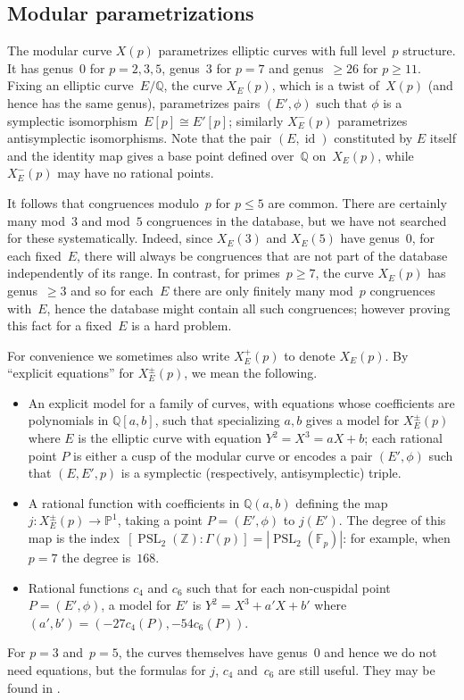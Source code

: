 \documentclass[12pt, reqno]{amsart}
\newcommand{\F}{\mathbb{F}}
\newcommand{\PP}{\mathbb{P}}
\newcommand{\Q}{\mathbb{Q}}
\newcommand{\Z}{\mathbb{Z}}
\newcommand{\PSL}{\operatorname{PSL}}
\DeclareMathOperator{\id}{id}
\numberwithin{equation}{section}
\theoremstyle{definition}
\theoremstyle{remark}
\begin{document}
\subsection{Modular parametrizations}
The modular curve $X(p)$ parametrizes elliptic curves with full
level~$p$ structure. It has genus~$0$ for $p=2,3,5$, genus~$3$ for
$p=7$ and genus~$\ge26$ for $p\ge11$.  Fixing an elliptic
curve~$E/\Q$, the curve $X_E(p)$, which is a twist of~$X(p)$ (and
hence has the same genus), parametrizes pairs $(E',\phi)$ such that
$\phi$ is a symplectic isomorphism~$E[p]\cong E'[p]$; similarly
$X_E^-(p)$ parametrizes antisymplectic isomorphisms. Note that the pair $(E,\id)$ constituted by $E$ itself and the identity map
gives a base point defined over~$\Q$ on~$X_E(p)$, while $X_E^-(p)$ may have no rational points.

It follows that congruences modulo~$p$ for $p\le 5$ are common.  There
are certainly many mod~$3$ and mod~$5$ congruences in the database,
but we have not searched for these systematically. Indeed, since
$X_E(3)$ and $X_E(5)$ have genus~0, for each fixed~$E$, there will
always be congruences that are not part of the database independently
of its range. In contrast, for primes~$p \geq 7$, the curve $X_E(p)$
has genus~$\geq 3$ and so for each~$E$ there are only finitely many
mod~$p$ congruences with~$E$, hence the database
might contain all such congruences; however proving this fact for a
fixed~$E$ is a hard problem.

For convenience 
we sometimes also write $X_E^+(p)$ to denote $X_E(p)$. 
By ``explicit equations'' for $X_E^{\pm}(p)$, we mean the
following.
\begin{itemize}
  \item An explicit model for a family of curves, with equations whose
    coefficients are polynomials in $\Q[a,b]$, such that specializing
    $a,b$ gives a model for $X_E^{\pm}(p)$ where $E$ is the elliptic
    curve with equation $Y^2=X^3=aX+b$; each rational point $P$ is
    either a cusp of the modular curve or encodes a pair $(E',\phi)$
    such that $(E,E', p)$ is a symplectic (respectively,
    antisymplectic) triple.
    \item A rational function with coefficients in $\Q(a,b)$ defining
      the map $j: X_E^{\pm}(p) \to \PP^1$, taking a point
      $P=(E',\phi)$ to $j(E')$.  The degree of this map is the
      index~$[\PSL_2(\Z):\Gamma(p)] = |\PSL_2(\F_p)|$: for example, when
        $p=7$ the degree is~$168$.
      \item Rational functions $c_4$ and $c_6$ such that for each
        non-cuspidal point~$P=(E',\phi)$, a model for $E'$ is
        $Y^2=X^3+a'X+b'$ where $(a',b')=(-27c_4(P),-54c_6(P))$.
\end{itemize}
For $p=3$ and~$p=5$, the curves themselves have genus~$0$ and hence we
do not need equations, but the formulas for $j$, $c_4$ and~$c_6$ are
still useful.  They may be found in \cite{Rubin-Silverberg}.
\end{document}
